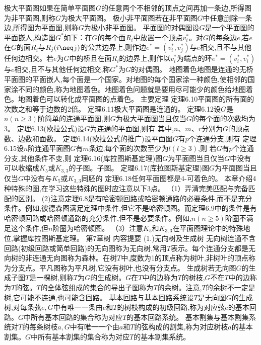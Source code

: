 极大平面图如果在简单平面图$G$的任意两个不相邻的顶点之间再加一条边,所得图为非平面图,则称$G$为极大平面图。
极小非平面图若在非平面图$G$中任意删除一条边,所得图为平面图,则称$G$为极小非平面图。
平面图的对偶图设$G$是一个平面图的平面嵌人,构造图$G^{*}$如下：在$G$的每个面$R_{i}$中放置一个顶点$v_{i}^{*}$。对$G$的每条边$e$,若$e$在$G$的面$R_{i}$与$R_{j}(i\neqj)$的公共边界上,则作边$e^{*}=\left(v_{i}^{*},v_{j}^{*}\right)$与$e$相交,且不与其他任何边相交。若$e$为$G$中的桥且在面$R_{i}$的边界上,则作以$v_{i}^{*}$为端点的环$e^{*}=\left(v_{i}^{*},v_{i}^{*}\right)$与$e$相交,且不与其他任何边相交,称$G^{*}$为$G$的对偶图。
地图着色地图是连通的无桥平面图的平面嵌人,每个面是一个国家。对地图的每个国家涂一种颜色,使相邻的国家涂不同的颜色,称为地图着色。地图着色问题就是要用尽可能少的颜色给地图着色。地图着色可以转化成平面图的点着色。
{主要定理}
定理6.10平面图的所有面的次数之和等于边数的2倍。
定理6.11极大平面图是连通的。
定理6.12设$G$是$n(n\geqslant3)$阶简单的连通平面图,则$G$为极大平面图当且仅当$G$的每个面的次数均为3。
定理6.13(欧拉公式)设$G$为连通的平面图,则有
其中,$n、m、r$分别为$G$的顶点数、边数和面数。
定理6.14(欧拉公式的推广)设平面图$G$有$p$个连通分支,则有
定理6.15设$n$阶连通平面图$G$有$m$条边,每个面的次数至少为$l(l\geqslant3)$,则
若$G$有$p$个连通分支,其他条件不变,则
定理6.16(库拉图斯基定理)图$G$为平面图当且仅当$G$中没有可以收缩成$K_{5}$或$K_{3,3}$的子图。子图。
定理6.17(库拉图斯基定理)图$G$为平面图当且仅当$G$中没有与$K_{5}$或$K_{3,3}$同胚的
定理6.18任何平面图都是4-可着色的。
本章介绍4种特殊的图,在学习这些特殊的图时应注意以下3点。
（1）弄清完美匹配与完备匹配的区别。
(2)注意定理6.8是有哈密顿回路或哈密顿通路的必要条件,而不是充分条件。例如,彼德森图满足定理中条件,但它不是哈密顿图。而定理6.9中的条件是有哈密顿回路或哈密顿通路的充分条件,但不是必要条件。例如,$n(n\geqslant5)$阶圈不满足这个条件,但$n$阶圈为哈密顿图。
（3）注意$K_{5}$和$K_{3,3}$在平面图理论中的特殊地位,掌握库拉图斯基定理。
{第7章树}
{内容提要}
{(1.)无向树及生成树}
无向树连通不含回路(初级回路或简单回路)的无向图称为无向树,常用$T$表示。每个连通分支都是无向树的非连通无向图称为森林。在树$T$中,度数为1的顶点称为树叶,非树叶的顶点称为分支点。平凡图称为平凡树,它没有树叶,也没有分支点。
生成树若无向图$G$的生成子图$T$是一棵树,则称$T$为$G$的生成树。$G$在$T$中的边称为$T$的树枝,$G$不在$T$中的边称为$T$的弦。$T$的全体弦组成的集合的导出子图称为$T$的余树。注意,$T$的余树不一定是树,它可能不连通,也可能含回路。
基本回路与基本回路系统设$T$是无向图$G$的生成树,对每条弦$e,G$中有唯一一条由$e$和$T$的树枝构成的初级回路,称为对应弦$e$的基本回路。$G$中所有基本回路的集合称为对应$T$的基本回路系统。
基本割集与基本割集系统对$T$的每条树枝$a,G$中有唯一一个由$a$和$T$的弦构成的割集,称为对应树枝$a$的基本割集。$G$中所有基本割集的集合称为对应$T$的基本割集系统。
